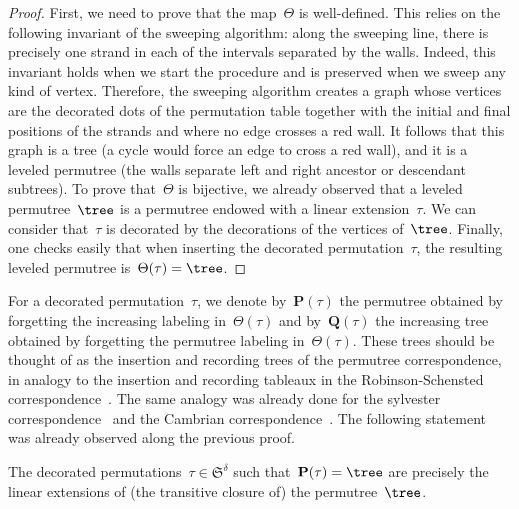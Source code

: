 \documentclass[ALCO]{cedram}
\newcommand{\fS}{\mathfrak{S}} %
\newcommand{\decoration}{\delta} %
\newcommand{\permutreeCorresp}{\Theta} %
\newcommand{\PSymbol}{\mathbf{P}} %
\newcommand{\QSymbol}{\mathbf{Q}} %
\begin{document}
\begin{proof}
First, we need to prove that the map~$\permutreeCorresp$ is well-defined. This relies on the following invariant of the sweeping algorithm: along the sweeping line, there is precisely one strand in each of the intervals separated by the walls. Indeed, this invariant  holds when we start the procedure and is preserved when we sweep any kind of vertex. Therefore, the sweeping algorithm creates a graph whose vertices are the decorated dots of the permutation table together with the initial and final positions of the strands and where no edge crosses a red wall. It follows that this graph is a tree (a cycle would force an edge to cross a red wall), and it is a leveled permutree (the walls separate left and right ancestor or descendant subtrees). To prove that~$\permutreeCorresp$ is bijective, we already observed that a leveled permutree~$\tree$ is a permutree endowed with a linear extension~$\tau$. We can consider that~$\tau$ is decorated by the decorations of the vertices of~$\tree$. Finally, one checks easily that when inserting the decorated permutation~$\tau$, the resulting leveled permutree is~$\permutreeCorresp(\tau) = \tree$.
\end{proof}

For a decorated permutation~$\tau$, we denote by~$\PSymbol(\tau)$ the permutree obtained by forgetting the increasing labeling in~$\permutreeCorresp(\tau)$ and by~$\QSymbol(\tau)$ the increasing tree obtained by forgetting the permutree labeling in~$\permutreeCorresp(\tau)$. These trees should be thought of as the insertion and recording trees of the permutree correspondence, in analogy to the insertion and recording tableaux in the Robinson-Schensted correspondence~\cite{Schensted}. The same analogy was already done for the sylvester correspondence~\cite{HivertNovelliThibon-algebraBinarySearchTrees} and the Cambrian correspondence~\cite{ChatelPilaud}. The following statement was already observed along the previous proof.

\begin{proposition}
\label{prop:fibersPSymbol}
The decorated permutations~$\tau \in \fS^\decoration$ such that~$\PSymbol(\tau) = \tree$ are precisely the linear extensions of (the transitive closure of) the permutree~$\tree$.
\end{proposition}
\end{document}
